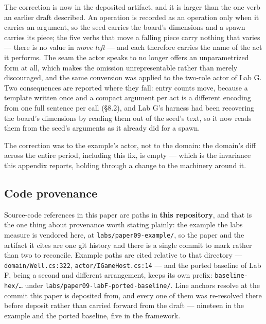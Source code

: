 \documentclass[
]{article}
\begin{document}
The correction is now in the deposited artifact, and it is larger than
the one verb an earlier draft described. An operation is recorded as an
operation only when it carries an argument, so the seed carries the
board's dimensions and a spawn carries its piece; the five verbs that
move a falling piece carry nothing that varies --- there is no value in
\emph{move left} --- and each therefore carries the name of the act it
performs. The seam the actor speaks to no longer offers an
unparametrized form at all, which makes the omission unrepresentable
rather than merely discouraged, and the same conversion was applied to
the two-role actor of Lab G. Two consequences are reported where they
fall: entry counts move, because a template written once and a compact
argument per act is a different encoding from one full sentence per call
(§8.2), and Lab G's harness had been recovering the board's dimensions
by reading them out of the seed's text, so it now reads them from the
seed's arguments as it already did for a spawn.

The correction was to the example's actor, not to the domain: the
domain's diff across the entire period, including this fix, is empty ---
which is the invariance this appendix reports, holding through a change
to the machinery around it.

\subsection{Code provenance}\label{code-provenance}

Source-code references in this paper are paths in \textbf{this
repository}, and that is the one thing about provenance worth stating
plainly: the example the labs measure is vendored here, at
\texttt{labs/paper09-example/}, so the paper and the artifact it cites
are one git history and there is a single commit to mark rather than two
to reconcile. Example paths are cited relative to that directory ---
\texttt{domain/Well.cs:322}, \texttt{actor/IGameHost.cs:14} --- and the
ported baseline of Lab F, being a second and different arrangement,
keeps its own prefix: \texttt{baseline-hex/…} under
\texttt{labs/paper09-labF-ported-baseline/}. Line anchors resolve at the
commit this paper is deposited from, and every one of them was
re-resolved there before deposit rather than carried forward from the
draft --- nineteen in the example and the ported baseline, five in the
framework.
\end{document}
